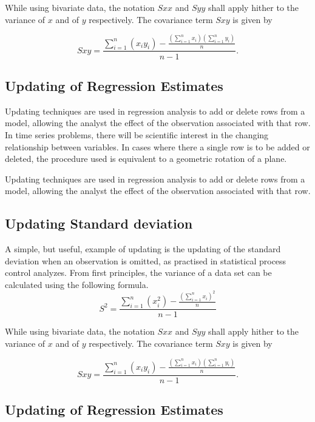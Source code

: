 \documentclass[12pt, a4paper]{report}
\theoremstyle{plain}
\theoremstyle{definition}
\theoremstyle{remark}
\begin{document}
While using bivariate data, the notation $Sxx$ and $Syy$ shall apply hither to the variance of $x$ and of $y$ respectively. The covariance term $Sxy$ is given by

\begin{equation}
Sxy=\frac{\sum_{i=1}^{n}(x_{i}y_{i})-\frac{(\sum_{i=1}^{n}x_{i})(\sum_{i=1}^{n}y_{i})}{n}}{n-1}.
\end{equation}

\subsection{Updating of Regression Estimates}
Updating techniques are used in regression analysis to add or
delete rows from a model, allowing the analyst the effect of the
observation associated with that row. In time series problems,
there will be scientific interest in the changing relationship
between variables. In cases where there a single row is to be
added or deleted, the procedure used is equivalent to a geometric
rotation of a plane.

Updating techniques are used in regression analysis to add or
delete rows from a model, allowing the analyst the effect of the
observation associated with that row.

\subsection{Updating Standard deviation}
A simple, but useful, example of updating is the updating of the
standard deviation when an observation is omitted, as practised in
statistical process control analyzes. From first principles, the
variance of a data set can be calculated using the following
formula.
\begin{equation}
S^{2}=\frac{\sum_{i=1}^{n}(x_{i}^{2})-\frac{(\sum_{i=1}^{n}x_{i})^{2}}{n}}{n-1}
\end{equation}

While using bivariate data, the notation $Sxx$ and $Syy$ shall
apply hither to the variance of $x$ and of $y$ respectively. The
covariance term $Sxy$ is given by

\begin{equation}
Sxy=\frac{\sum_{i=1}^{n}(x_{i}y_{i})-\frac{(\sum_{i=1}^{n}x_{i})(\sum_{i=1}^{n}y_{i})}{n}}{n-1}.
\end{equation}

\subsection{Updating of Regression Estimates}
\end{document}
